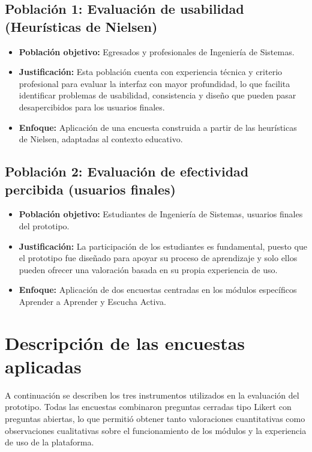 \subsection*{Población 1: Evaluación de usabilidad (Heurísticas de Nielsen)}
\begin{itemize}
    \item \textbf{Población objetivo:} Egresados y profesionales de Ingeniería de Sistemas.
    
    \item \textbf{Justificación:} Esta población cuenta con experiencia técnica y criterio profesional para evaluar la interfaz con mayor profundidad, lo que facilita identificar problemas de usabilidad, consistencia y diseño que pueden pasar desapercibidos para los usuarios finales.
    
    \item \textbf{Enfoque:} Aplicación de una encuesta construida a partir de las heurísticas de Nielsen, adaptadas al contexto educativo.
\end{itemize}

\subsection*{Población 2: Evaluación de efectividad percibida (usuarios finales)}
\begin{itemize}
    \item \textbf{Población objetivo:} Estudiantes de Ingeniería de Sistemas, usuarios finales del prototipo.
    
    \item \textbf{Justificación:} La participación de los estudiantes es fundamental, puesto que el prototipo fue diseñado para apoyar su proceso de aprendizaje y solo ellos pueden ofrecer una valoración basada en su propia experiencia de uso.
    
    \item \textbf{Enfoque:} Aplicación de dos encuestas centradas en los módulos específicos Aprender a Aprender y Escucha Activa.
\end{itemize}

\section{Descripción de las encuestas aplicadas}

A continuación se describen los tres instrumentos utilizados en la evaluación del prototipo. Todas las encuestas combinaron preguntas cerradas tipo Likert con preguntas abiertas, lo que permitió obtener tanto valoraciones cuantitativas como observaciones cualitativas sobre el funcionamiento de los módulos y la experiencia de uso de la plataforma.


